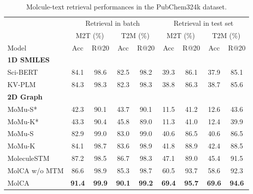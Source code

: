 \documentclass[11pt]{article}
\begin{document}
\begin{table*}[t!]
    \small
    \centering
    \begin{subtable}[t]{\textwidth}
    \small
    \centering
    \begin{tabular}{lcccccccc}
    \toprule
    & \multicolumn{4}{c}{Retrieval in batch} & \multicolumn{4}{c}{Retrieval in test set} \\ 
    & \multicolumn{2}{c}{M2T (\%)} & \multicolumn{2}{c}{T2M (\%)} & \multicolumn{2}{c}{M2T (\%)} & \multicolumn{2}{c}{T2M (\%)} \\\cmidrule(lr){2-3}\cmidrule(lr){4-5} \cmidrule(lr){6-7} \cmidrule(lr){8-9}
    Model & Acc & R@20 & Acc & R@20 & Acc & R@20 & Acc & R@20 \\\midrule
    \multicolumn{2}{l}{\textbf{1D SMILES}} & \multicolumn{1}{l}{} & \multicolumn{1}{l}{} & \multicolumn{1}{l}{} & \multicolumn{1}{l}{} & \multicolumn{1}{l}{} & \multicolumn{1}{l}{} & \multicolumn{1}{l}{} \\
    Sci-BERT & 84.1 & 98.6 & 82.5 & 98.2 & 39.3 & 86.1 & 37.9 & 85.1 \\
    KV-PLM & 84.3 & 98.3 & 82.3 & 98.3 & 38.8 & 86.3 & 38.7 & 85.6 \\\midrule
    \multicolumn{2}{l}{\textbf{2D Graph}} & \multicolumn{1}{l}{} & \multicolumn{1}{l}{} & \multicolumn{1}{l}{} & \multicolumn{1}{l}{} & \multicolumn{1}{l}{} & \multicolumn{1}{l}{} & \multicolumn{1}{l}{} \\
    MoMu-S* & 42.3 & 90.1 & 43.7 & 90.1 & 11.5 & 41.2 & 12.6 & 43.6 \\
    MoMu-K* & 43.3 & 90.4 & 45.8 & 89.0 & 11.3 & 41.0 & 12.4 & 39.9 \\
    MoMu-S & 82.9 & 99.0 & 83.0 & 99.0 & 40.6 & 86.5 & 40.6 & 86.5 \\
    MoMu-K & 84.1 & 98.7 & 83.6 & 98.9 & 41.8 & 88.9 & 42.4 & 88.5 \\
    MoleculeSTM & 87.2 & 98.5 & 86.7 & 98.3 & 47.1 & 89.0 & 45.4 & 91.5 \\
    MolCA w/o MTM & 86.6 & 98.9 & 85.3 & 98.7 & 60.5 & 93.7 & 58.6 & 92.3 \\
    MolCA & \textbf{91.4} & \textbf{99.9} & \textbf{90.1} & \textbf{99.2} & \textbf{69.4} & \textbf{95.7} & \textbf{69.6} & \textbf{94.6} \\\bottomrule
    \end{tabular}
    \caption{Molcule-text retrieval performances in the PubChem324k dataset.}
   \end{subtable}
   \centering
   \small
   \begin{subtable}[t]{\textwidth}

\end{subtable}
\end{table*}
\end{document}
